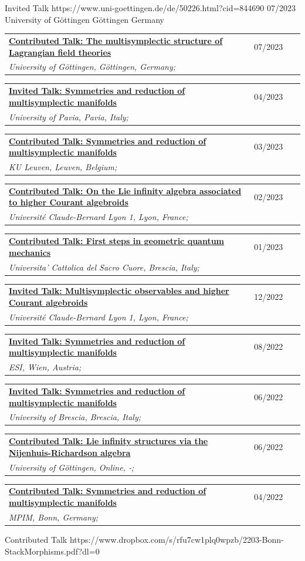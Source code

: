\documentclass[a4paper]{article}
\newcommand{\longvoice}[8]{
	\begin{tabular}{p{0.83\linewidth} p{0.17\linewidth} }
		\textbf{\href{#3}{#2: #1}} & #4 
		\\ 
		\textit{#5, #6, #7;} & {\small\emph{#8}}
	\end{tabular}
	\vspace{.5em}
}
\begin{document}
		{Invited Talk}
		{https://www.uni-goettingen.de/de/50226.html?cid=844690}
		{07/2023}
		{University of Göttingen}
		{Göttingen}
		{Germany}
		{}
	\longvoice{The multisymplectic structure of Lagrangian field theories}
		{Contributed Talk}
		{https://www.dropbox.com/s/lsaqjhq6g0rmagw/2307-Gottingen-MsLFT.pdf?dl=0}
		{07/2023}
		{University of Göttingen}
		{Göttingen}
		{Germany}
		{}
	\longvoice{Symmetries and reduction of multisymplectic manifolds}
		{Invited Talk}
		{https://mathematicalphysicspavia.wordpress.com/2023/04/04/antonio-michele-miti-28-04-2023-symmetries-and-reduction-of-multisymplectic-manifoldsantonio-michele-miti/}
		{04/2023}
		{University of Pavia}
		{Pavia}
		{Italy}
		{}
	\longvoice{Symmetries and reduction of multisymplectic manifolds}
		{Contributed Talk}
		{https://wis.kuleuven.be/events/young-researchers-workshop2023/abstractsforcontributedtalks}
		{03/2023}
		{KU Leuven}
		{Leuven}
		{Belgium}
		{}
	\longvoice{On the Lie infinity algebra associated to higher Courant algebroids}
		{Contributed Talk}
		{https://www.dropbox.com/s/whusmg6kj8dbqd7/2302-Lyon-HigherGeoWorkgroup.pdf?dl=0}
		{02/2023}
		{Université Claude-Bernard Lyon 1}
		{Lyon}
		{France}
		{}
	\longvoice{First steps in geometric quantum mechanics}
		{Contributed Talk}
		{https://www.dropbox.com/s/oqd6psmeiexwhnt/2301-Brescia-PhdSeminar.pdf?dl=0}
		{01/2023}
		{Universita' Cattolica del Sacro Cuore}
		{Brescia}
		{Italy}
		{}
	\longvoice{Multisymplectic observables and higher Courant algebroids}
		{Invited Talk}
		{https://indico.math.cnrs.fr/event/8621/}
		{12/2022}
		{Université Claude-Bernard Lyon 1}
		{Lyon}
		{France}
		{}
	\longvoice{Symmetries and reduction of multisymplectic manifolds}
		{Invited Talk}
		{https://www.esi.ac.at/events/t1028/}
		{08/2022}
		{ESI}
		{Wien}
		{Austria}
		{}
	\longvoice{Symmetries and reduction of multisymplectic manifolds}
		{Invited Talk}
		{https://www.dropbox.com/s/2elzcczx7m0o9zf/2206-Brescia-YoungPeople4Math.pdf?dl=0}
		{06/2022}
		{University of Brescia}
		{Brescia}
		{Italy}
		{}
	\longvoice{Lie infinity structures via the Nijenhuis-Richardson algebra}
		{Contributed Talk}
		{https://www.dropbox.com/s/lq862vynwme0eyn/2206-Online-GoodMorningSfars.pdf?dl=0}
		{06/2022}
		{University of Göttingen}
		{Online}
		{-}
		{}
	\longvoice{Symmetries and reduction of multisymplectic manifolds}
		{Contributed Talk}
		{https://www.mpim-bonn.mpg.de/node/11285}
		{04/2022}
		{MPIM}
		{Bonn}
		{Germany}
		{}
		{Contributed Talk}
		{https://www.dropbox.com/s/rfu7cw1plq0wpzb/2203-Bonn-StackMorphisms.pdf?dl=0}
\end{document}
